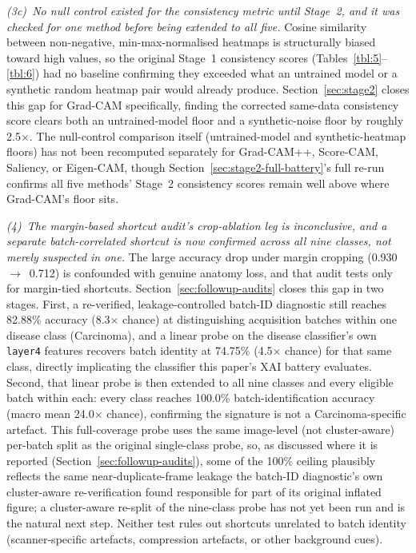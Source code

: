 \textit{(3c)~No null control existed for the consistency metric until Stage~2, and it was checked for one method before being extended to all five.} Cosine similarity between non-negative, min-max-normalised heatmaps is structurally biased toward high values, so the original Stage~1 consistency scores (Tables~\ref{tbl:5}--\ref{tbl:6}) had no baseline confirming they exceeded what an untrained model or a synthetic random heatmap pair would already produce. Section~\ref{sec:stage2} closes this gap for Grad-CAM specifically, finding the corrected same-data consistency score clears both an untrained-model floor and a synthetic-noise floor by roughly 2.5$\times$. The null-control comparison itself (untrained-model and synthetic-heatmap floors) has not been recomputed separately for Grad-CAM++, Score-CAM, Saliency, or Eigen-CAM, though Section~\ref{sec:stage2-full-battery}'s full re-run confirms all five methods' Stage~2 consistency scores remain well above where Grad-CAM's floor sits.

\textit{(4)~The margin-based shortcut audit's crop-ablation leg is inconclusive, and a separate batch-correlated shortcut is now confirmed across all nine classes, not merely suspected in one.} The large accuracy drop under margin cropping (0.930~$\rightarrow$~0.712) is confounded with genuine anatomy loss, and that audit tests only for margin-tied shortcuts. Section~\ref{sec:followup-audits} closes this gap in two stages. First, a re-verified, leakage-controlled batch-ID diagnostic still reaches 82.88\% accuracy (8.3$\times$ chance) at distinguishing acquisition batches within one disease class (Carcinoma), and a linear probe on the disease classifier's own \texttt{layer4} features recovers batch identity at 74.75\% (4.5$\times$ chance) for that same class, directly implicating the classifier this paper's XAI battery evaluates. Second, that linear probe is then extended to all nine classes and every eligible batch within each: every class reaches 100.0\% batch-identification accuracy (macro mean 24.0$\times$ chance), confirming the signature is not a Carcinoma-specific artefact. This full-coverage probe uses the same image-level (not cluster-aware) per-batch split as the original single-class probe, so, as discussed where it is reported (Section~\ref{sec:followup-audits}), some of the 100\% ceiling plausibly reflects the same near-duplicate-frame leakage the batch-ID diagnostic's own cluster-aware re-verification found responsible for part of its original inflated figure; a cluster-aware re-split of the nine-class probe has not yet been run and is the natural next step. Neither test rules out shortcuts unrelated to batch identity (scanner-specific artefacts, compression artefacts, or other background cues).

